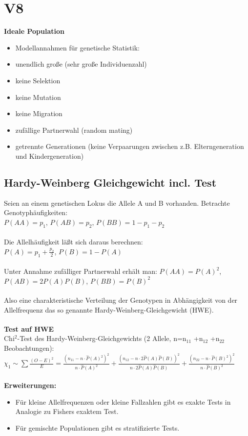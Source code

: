 \section{V8}
\textbf{Ideale Population}
\begin{itemize}
	\item Modellannahmen für genetische Statistik:
	\item unendlich große (sehr große Individuenzahl)
	\item keine Selektion
	\item keine Mutation
	\item keine Migration
	\item zufällige Partnerwahl (random mating)
	\item getrennte Generationen (keine Verpaarungen zwischen z.B. Elterngeneration und Kindergeneration)
\end{itemize}

\subsection{Hardy-Weinberg Gleichgewicht incl. Test}
Seien an einem genetischen Lokus die Allele A und B vorhanden. Betrachte Genotyphäufigkeiten:\\
$P(AA)=p_1$, $P(AB)=p_2$, $P(BB)=1-p_1-p_2$\\\\
Die Allelhäufigkeit läßt sich daraus berechnen:\\
$P(A)=p_1+\frac{p_2}{2}$, $P(B)=1-P(A)$\\\\
Unter Annahme zufälliger Partnerwahl erhält man:
$P(AA)=P(A)^2$, $P(AB)=2P(A)P(B)$, $P(BB)=P(B)^2$\\\\
Also eine charakteristische Verteilung der Genotypen in Abhängigkeit von der Allelfrequenz das so genannte Hardy-Weinberg-Gleichgewicht (HWE).
\\\\
\textbf{Test auf HWE}\\
Chi$^2$-Test des Hardy-Weinberg-Gleichgewichts (2 Allele, n=n$_{11}$ +n$_{12}$ +n$_{22}$ Beobachtungen):\\
$\chi_1 \sim \displaystyle \sum \frac{(O-E)^2}{E} = \frac{(n_{11} - n \cdot \hat{P}(A)^2)^2}{n \cdot \hat{P}(A)^2} + \frac{(n_{12} - n \cdot 2\hat{P}(A)\hat{P}(B))^2}{n \cdot 2\hat{P}(A)\hat{P}(B)} + \frac{(n_{22} - n \cdot \hat{P}(B)^2)^2}{n \cdot \hat{P}(B)^2}$
\\\\
\textbf{Erweiterungen:}
\begin{itemize}
	\item Für kleine Allelfrequenzen oder kleine Fallzahlen gibt es exakte Tests in Analogie zu Fishers exaktem Test.
	\item Für gemischte Populationen gibt es stratifizierte Tests.
\end{itemize}

